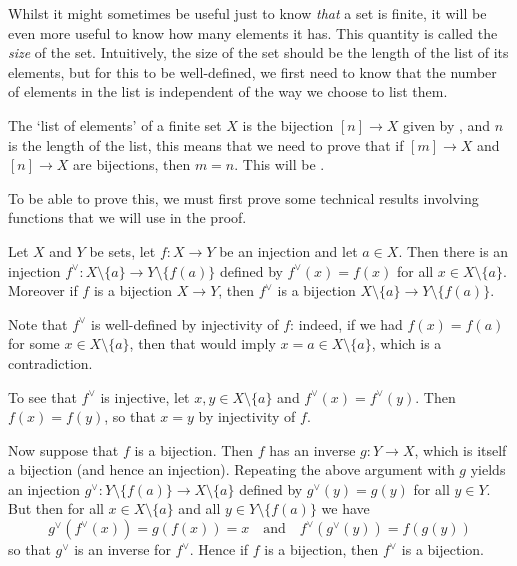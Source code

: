 Whilst it might sometimes be useful just to know \textit{that} a set is finite, it will be even more useful to know how many elements it has. This quantity is called the \textit{size} of the set. Intuitively, the size of the set should be the length of the list of its elements, but for this to be well-defined, we first need to know that the number of elements in the list is independent of the way we choose to list them.

The `list of elements' of a finite set $X$ is the bijection $[n] \to X$ given by , and $n$ is the length of the list, this means that we need to prove that if $[m] \to X$ and $[n] \to X$ are bijections, then $m=n$. This will be .

To be able to prove this, we must first prove some technical results involving functions that we will use in the proof.

\begin{lemma}
\label{lemRemoveElementFromDomainAndCodomain}
Let $X$ and $Y$ be sets, let $f : X \to Y$ be an injection and let $a \in X$. Then there is an injection $f^{\vee} : X \setminus \{ a \} \to Y \setminus \{ f(a) \}$ defined by $f^{\vee}(x) = f(x)$ for all $x \in X \setminus \{ a \}$. Moreover if $f$ is a bijection $X \to Y$, then $f^{\vee}$ is a bijection $X \setminus \{ a \} \to Y \setminus \{ f(a) \}$.
\end{lemma}

\begin{cproof}
Note that $f^{\vee}$ is well-defined by injectivity of $f$: indeed, if we had $f(x) = f(a)$ for some $x \in X \setminus \{ a \}$, then that would imply $x=a \in X \setminus \{ a \}$, which is a contradiction.

To see that $f^{\vee}$ is injective, let $x,y \in X \setminus \{ a \}$ and $f^{\vee}(x) = f^{\vee}(y)$. Then $f(x) = f(y)$, so that $x=y$ by injectivity of $f$.

Now suppose that $f$ is a bijection. Then $f$ has an inverse $g : Y \to X$, which is itself a bijection (and hence an injection). Repeating the above argument with $g$ yields an injection $g^{\vee} : Y \setminus \{ f(a) \} \to X \setminus \{ a \}$ defined by $g^{\vee}(y) = g(y)$ for all $y \in Y$. But then for all $x \in X \setminus \{ a \}$ and all $y \in Y \setminus \{ f(a) \}$ we have
\[ g^{\vee}(f^{\vee}(x)) = g(f(x)) = x \quad \text{and} \quad f^{\vee}(g^{\vee}(y)) = f(g(y)) \]
so that $g^{\vee}$ is an inverse for $f^{\vee}$. Hence if $f$ is a bijection, then $f^{\vee}$ is a bijection.
\end{cproof}

